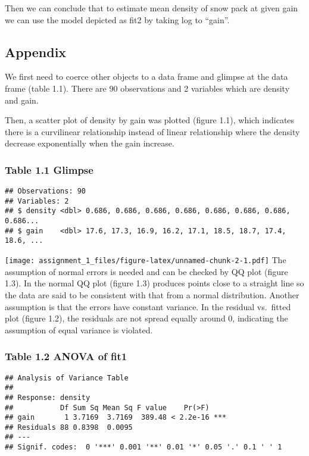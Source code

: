 \documentclass[]{article}
\begin{document}
Then we can conclude that to estimate mean density of snow pack at given
gain we can use the model depicted as fit2 by taking log to ``gain''.

\subsection{Appendix}\label{appendix}

We first need to coerce other objects to a data frame and glimpse at the
data frame (table 1.1). There are 90 observations and 2 variables which
are density and gain.

Then, a scatter plot of density by gain was plotted (figure 1.1), which
indicates there is a curvilinear relationship instead of linear
relationship where the density decrease exponentially when the gain
increase.

\subsubsection{Table 1.1 Glimpse}\label{table-1.1-glimpse}

\begin{verbatim}
## Observations: 90
## Variables: 2
## $ density <dbl> 0.686, 0.686, 0.686, 0.686, 0.686, 0.686, 0.686, 0.686...
## $ gain    <dbl> 17.6, 17.3, 16.9, 16.2, 17.1, 18.5, 18.7, 17.4, 18.6, ...
\end{verbatim}

\texttt{[image: assignment\_1\_files/figure-latex/unnamed-chunk-2-1.pdf]}
The assumption of normal errors is needed and can be checked by QQ plot
(figure 1.3). In the normal QQ plot (figure 1.3) produces points close
to a straight line so the data are said to be consistent with that from
a normal distribution. Another assumption is that the errors have
constant variance. In the residual vs.~fitted plot (figure 1.2), the
residuals are not spread equally around 0, indicating the assumption of
equal variance is violated.

\subsubsection{Table 1.2 ANOVA of fit1}\label{table-1.2-anova-of-fit1}

\begin{verbatim}
## Analysis of Variance Table
## 
## Response: density
##           Df Sum Sq Mean Sq F value    Pr(>F)    
## gain       1 3.7169  3.7169  389.48 < 2.2e-16 ***
## Residuals 88 0.8398  0.0095                      
## ---
## Signif. codes:  0 '***' 0.001 '**' 0.01 '*' 0.05 '.' 0.1 ' ' 1
\end{verbatim}
\end{document}
